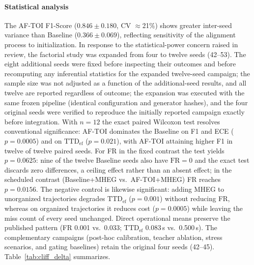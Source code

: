 \documentclass[a4paper,fleqn]{cas-dc}
\newcommand{\AFTOI}{\mbox{AF-TOI}\xspace}
\begin{document}
\paragraph{Statistical analysis}
The \AFTOI F1-Score ({\color{\revcolor}$0.846 \pm 0.180$, CV $\approx$21\%}) shows greater
inter-seed variance than Baseline ({\color{\revcolor}$0.366 \pm 0.069$}), reflecting sensitivity of
the alignment process to initialization.
{\color{\revcolor}In response to the statistical-power concern raised in
review, the factorial study was expanded from four to twelve seeds (42--53).
The eight additional seeds were fixed before inspecting their outcomes and
before recomputing any inferential statistics for the expanded twelve-seed
campaign; the sample size was not adjusted as a function of the
additional-seed results, and all twelve are reported regardless of outcome; the expansion
was executed with the same frozen pipeline (identical configuration and
generator hashes), and the four original seeds were verified to reproduce the
initially reported campaign exactly before integration. With $n=12$ the exact
paired Wilcoxon test resolves conventional significance:
\mbox{AF-TOI} dominates the Baseline on F1 and ECE ($p=0.0005$) and on
$\mathrm{TTD}_{\mathrm{ef}}$ ($p=0.021$), with \mbox{AF-TOI} attaining higher
F1 in twelve of twelve paired seeds. For FR in the fixed contrast the test
yields $p=0.0625$: nine of the twelve Baseline seeds also have $\mathrm{FR}=0$
and the exact test discards zero differences, a ceiling effect rather than an
absent effect; in the scheduled contrast (Baseline+MHEG vs.\
\mbox{AF-TOI}+MHEG) FR reaches $p=0.0156$. The negative control is likewise
significant: adding \mbox{MHEG} to unorganized trajectories degrades
$\mathrm{TTD}_{\mathrm{ef}}$ ($p=0.001$) without reducing FR, whereas on
organized trajectories it reduces cost ($p=0.0005$) while leaving the miss
count of every seed unchanged. Direct operational means preserve the published
pattern (FR 0.001 vs.\ 0.033; $\mathrm{TTD}_{\mathrm{ef}}$ 0.083\,s vs.\
0.500\,s). The complementary campaigns (post-hoc calibration, teacher
ablation, stress scenarios, and gating baselines) retain the original four
seeds (42--45).}
Table~\ref{tab:cliff_delta} summarizes.
\end{document}
